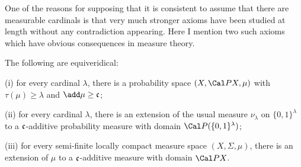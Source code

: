 
\def\chaptername{Real-valued-measurable cardinals}
\def\sectionname{PMEA and NMA}


One of the reasons for supposing that it is consistent to assume that there
are measurable cardinals is that very much stronger axioms have been
studied at length without any contradiction appearing.   Here I mention two
such axioms which have obvious consequences in measure theory.

 The following are equiveridical:

(i) for every cardinal $\lambda$, there is a probability space
$(X,\Cal PX,\mu)$ with $\tau(\mu)\ge\lambda$ and
$\add\mu\ge\frak c$;

(ii) for every cardinal $\lambda$, there is an extension of the usual
measure $\nu_{\lambda}$ on $\{0,1\}^{\lambda}$ to a $\frak c$-additive
probability measure with domain $\Cal P(\{0,1\}^{\lambda})$;

(iii) for every semi-finite locally compact measure space
$(X,\Sigma,\mu)$,
there is an extension of $\mu$ to a
$\frak c$-additive measure with domain $\Cal PX$.

